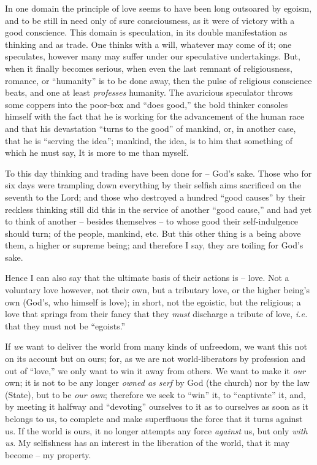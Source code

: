 \documentclass[12pt,a4paper]{book}
\begin{document}
In one domain the principle of love seems to have been long outsoared by 
egoism, and to be still in need only of sure consciousness, as it were of 
victory with a good conscience. This domain is speculation, in its double 
manifestation as thinking and as trade. One thinks with a will, whatever may 
come of it; one speculates, however many may suffer under our speculative 
undertakings. But, when it finally becomes serious, when even the last remnant 
of religiousness, romance, or ``humanity'' is to be done away, then the 
pulse of religious conscience beats, and one at least \textit{professes} 
humanity. The avaricious speculator throws some coppers into the poor-box and 
``does good,'' the bold thinker consoles himself with the fact that he is 
working for the advancement of the human race and that his devastation 
``turns to the good'' of mankind, or, in another case, that he is ``serving 
the idea''; mankind, the idea, is to him that something of which he must say, 
It is more to me than myself.

To this day thinking and trading have been done for -- God's sake. Those who 
for six days were trampling down everything by their selfish aims sacrificed 
on the seventh to the Lord; and those who destroyed a hundred ``good 
causes'' by their reckless thinking still did this in the service of another 
``good cause,'' and had yet to think of another -- besides themselves -- to 
whose good their self-indulgence should turn; of the people, mankind, etc. But 
this other thing is a being above them, a higher or supreme being; and 
therefore I say, they are toiling for God's sake.

Hence I can also say that the ultimate basis of their actions is -- love. Not 
a voluntary love however, not their own, but a tributary love, or the higher 
being's own (God's, who himself is love); in short, not the egoistic, but the 
religious; a love that springs from their fancy that they \textit{must} 
discharge a tribute of love, \textit{i.e.} that they must not be 
``egoists.''

If \textit{we} want to deliver the world from many kinds of unfreedom, we want 
this not on its account but on ours; for, as we are not world-liberators by 
profession and out of ``love,'' we only want to win it away from others. We 
want to make it \textit{our} own; it is not to be any longer \textit{owned as 
serf} by God (the church) nor by the law (State), but to be \textit{our own}; 
therefore we seek to ``win'' it, to ``captivate'' it, and, by meeting it 
halfway and ``devoting'' ourselves to it as to ourselves as soon as it 
belongs to us, to complete and make superfluous the force that it turns 
against us. If the world is ours, it no longer attempts any force 
\textit{against} us, but only \textit{with us}. My selfishness has an interest 
in the liberation of the world, that it may become -- my property.
\end{document}
